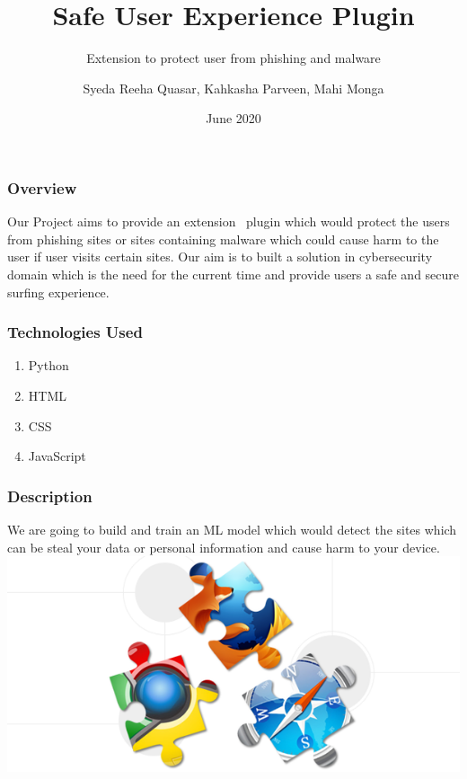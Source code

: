 \documentclass[14pt]{beamer}
\title[SUE]{Safe User Experience Plugin}
\subtitle{Extension to protect user from phishing and malware}
\author[Team 36]{Syeda Reeha Quasar, Kahkasha Parveen, Mahi Monga}
\date{June 2020}
\begin{document}
\begin{frame}
    \titlepage
\end{frame}

\begin{frame}
    \frametitle{Overview}
    Our Project aims to provide an extension \ plugin which would protect the users from phishing sites or sites containing malware which could cause harm to the user if user visits certain sites.
    Our aim is to built a solution in cybersecurity domain which is the need for the current time and provide users a safe and secure surfing experience.
\end{frame}

\begin{frame}
    \frametitle{Technologies Used}
    \begin{enumerate}
        \item{Python}
        \item{HTML}
        \item{CSS}
        \item{JavaScript}
    \end{enumerate}
\end{frame}

\begin{frame}
    \frametitle{Description}
    We are going to build and train an ML model which would detect the sites which can be steal your data or personal information and cause harm to your device.
    \includegraphics{imag}
    \href{https://developer.chrome.com/extensions/getstarted}{}
\end{frame}
\end{document}
